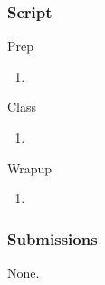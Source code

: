 \documentclass[12pt]{article}
\begin{document}
\subsubsection{Script}
Prep
\begin{enumerate}
\item
\end{enumerate}
Class
\begin{enumerate}
\item
\end{enumerate}
Wrapup
\begin{enumerate}
\item
\end{enumerate}

\subsubsection{Submissions}
None.
\end{document}
